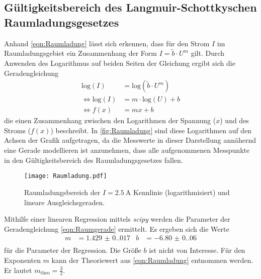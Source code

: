 \subsection{Gültigkeitsbereich des Langmuir-Schottkyschen Raumladungsgesetzes}
\label{subsec:A_Raumladung}
Anhand \autoref{eqn:Raumladung} lässt sich erkennen, dass für den Strom $I$ im Raumladungsgebiet ein Zusammenhang der Form $I = \tilde{b} \cdot U^m$ gilt. Durch Anwenden des 
Logarithmus auf beiden Seiten der Gleichung ergibt sich die Geradengleichung
\begin{align}
  \label{eqn:Raumgerade}
  \mathrm{log}(I) &= \mathrm{log}\left(\tilde{b} \cdot U^m \right) \nonumber \\
  \Leftrightarrow \mathrm{log}(I) &= m \cdot \mathrm{log}(U) + b   \nonumber \\ 
  \Leftrightarrow f(x) &= mx + b
\end{align}
die einen Zusammenhang zwischen den Logarithmen der Spannung ($x$) und des Stroms ($f(x)$) beschreibt. In \autoref{fig:Raumladung} sind diese Logarithmen auf den Achsen der Grafik aufgetragen,
da die Messwerte in dieser Darstellung annähernd eine Gerade modellieren ist anzunehmen, dass alle aufgenommenen Messpunkte in den Gültigkeitsbereich des Raumladungsgesetzes
fallen.

\begin{figure}
  \centering
  \texttt{[image: Raumladung.pdf]}
  \caption{Raumladungsbereich der $I = \qty{2.5}{\ampere}$ Kennlinie (logarithmisiert) und lineare Ausgleichsgeraden.}
  \label{fig:Raumladung}
\end{figure}

Mithilfe einer linearen Regression mittels \textit{scipy} \cite{scipy} werden die Parameter der Geradengleichung \eqref{eqn:Raumgerade} ermittelt. 
Es ergeben sich die Werte
\begin{align*}
  \label{eqn:Parameter1}
  m &= \num{1.429(0.017)} & b &= \num{-6.80(0.06)} \\
\end{align*}
für die Parameter der Regression. Die Größe $b$ ist nicht von Interesse. Für den Exponenten $m$ kann der Theoriewert aus \autoref{eqn:Raumladung} entnommen werden. Er lautet
$m_\text{theo} = \frac{3}{2}$.

